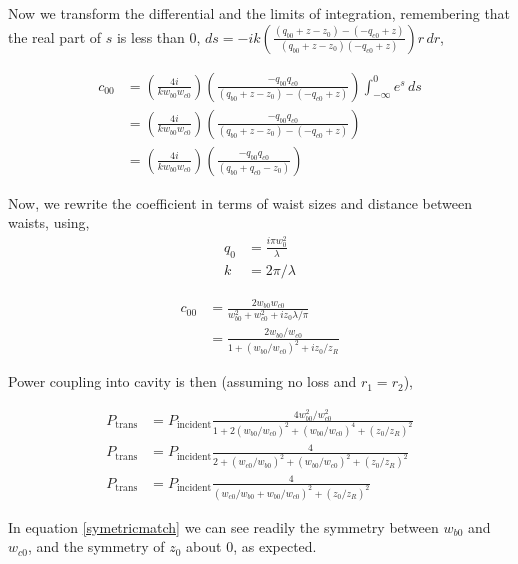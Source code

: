 Now we transform the differential and the limits of integration, remembering
that the real part of $s$ is less than $0$, $ds =
-ik \left( \frac{(q_{b0}+z-z_0)-(-q_{c0}+z)}{(q_{b0}+z-z_0)(-q_{c0}+z)} \right) r \,dr
$,

\begin{align}
    c_{00} &= \left( \frac{4i}{k w_{b0} w_{c0}} \right)
    \left( \frac{- q_{b0} q_{c0}}{(q_{b0}+z-z_0)-(-q_{c0}+z)} \right)
    \int^{0}_{-\infty} e^s \,ds \nonumber
\\  &= \left( \frac{4i}{k w_{b0} w_{c0}} \right)
    \left( \frac{- q_{b0} q_{c0}}{(q_{b0}+z-z_0)-(-q_{c0}+z)} \right) \nonumber
\\  &= \left( \frac{4i}{k w_{b0} w_{c0}} \right)
    \left( \frac{- q_{b0} q_{c0}}{(q_{b0}+q_{c0}-z_0)} \right)
\end{align}

Now, we rewrite the coefficient in terms of waist sizes and distance between waists, using,
\begin{align*}
    q_0 &= \frac{i \pi w_0^2}{\lambda}
\\  k &= 2 \pi / \lambda
\end{align*}

\begin{align}
    c_{00} &= \frac{2 w_{b0} w_{c0}}{w_{b0}^2 + w_{c0}^2 + i z_0 \lambda / \pi} \nonumber
\\  &= \frac{2 w_{b0} / w_{c0}}{1 + \left( w_{b0} /w_{c0} \right)^2 + i z_0 / z_R}
\end{align}

Power coupling into cavity is then (assuming no loss and $r_1 = r_2$),


\begin{align}
    P_{\mathrm{trans}}  &= P_{\mathrm{incident}} \frac{4 w_{b0}^2 / w_{c0}^2}{1 +
    2 \left( w_{b0} /w_{c0} \right)^2 + \left( w_{b0} /w_{c0} \right)^4 + \left(
    z_0 / z_R \right)^2} \nonumber
\\  P_{\mathrm{trans}}  &= P_{\mathrm{incident}} \frac{4}{ 2 + \left( w_{c0} /
    w_{b0} \right)^2 + \left( w_{b0} /w_{c0} \right)^2 + \left(
    z_0 / z_R \right)^2}
\\  P_{\mathrm{trans}}  &= P_{\mathrm{incident}} \frac{4}{ \left( w_{c0} /
    w_{b0} + w_{b0} / w_{c0} \right)^2 + \left( z_0 / z_R \right)^2}
    \label{symetricmatch}
\end{align}

In equation \ref{symetricmatch} we can see readily the symmetry between
$w_{b0}$ and $w_{c0}$, and the symmetry of $z_0$ about $0$, as expected.


